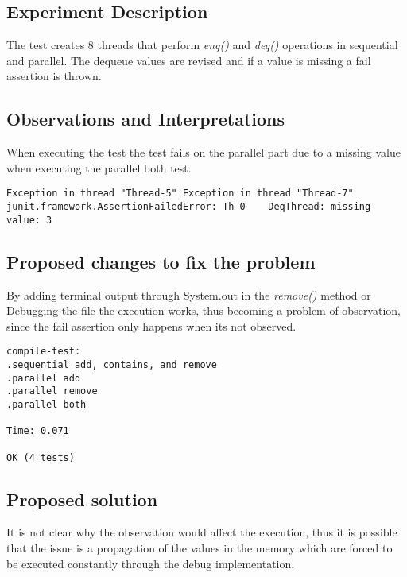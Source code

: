 
\subsection{Experiment Description} 
\par
The test creates $8$ threads that perform \textit{enq()} and \textit{deq()} operations in sequential and parallel.
The dequeue values are revised and if a value is missing a fail assertion is thrown.
\par


\subsection{Observations and Interpretations}

\par
When executing the test the test fails on the parallel part due to a missing value when executing the parallel both test.
\begin{lstlisting}[frame=single,breaklines=true]
Exception in thread "Thread-5" Exception in thread "Thread-7" junit.framework.AssertionFailedError: Th 0	DeqThread: missing value: 3
\end{lstlisting}



\subsection{Proposed changes to fix the problem}

\par
By adding terminal output through System.out in the \textit{remove()} method or Debugging the file the execution works, thus becoming a problem of observation, since the fail assertion only happens when its not observed.
\begin{lstlisting}[frame=single,breaklines=true]
compile-test:
.sequential add, contains, and remove
.parallel add
.parallel remove
.parallel both

Time: 0.071

OK (4 tests)
\end{lstlisting}




\subsection{Proposed solution}
\par
It is not clear why the observation would affect the execution, thus it is possible that the issue is a propagation of the values in the memory which are forced to be executed constantly through the debug implementation.

